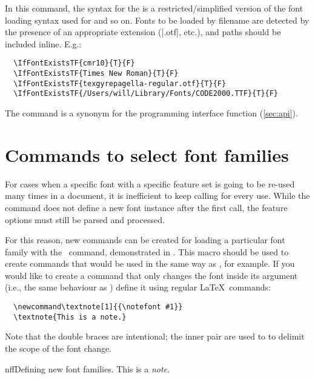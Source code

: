 \documentclass[a4paper]{l3doc}
\begin{document}
In this command, the syntax for the  is a restricted/simplified version of the font loading syntax used for  and so on.
Fonts to be loaded by filename are detected by the presence of an appropriate extension (|.otf|, etc.), and paths should be included inline.
E.g.:
\begin{Verbatim}
  \IfFontExistsTF{cmr10}{T}{F}
  \IfFontExistsTF{Times New Roman}{T}{F}
  \IfFontExistsTF{texgyrepagella-regular.otf}{T}{F}
  \IfFontExistsTF{/Users/will/Library/Fonts/CODE2000.TTF}{T}{F}
\end{Verbatim}

The  command is a synonym for the programming interface function  (\vref*{sec:api}).



\section{Commands to select font families}


\noindent For cases when a specific font with a specific
feature set is going to be re-used many times in a document, it is inefficient
to keep calling  for every use. While the  command does not define
a new font instance after the first call, the feature options must still be
parsed and processed.

\DescribeMacro{\newfontfamily}
For this reason, new commands can be created for loading a particular font
family with the \cmd\newfontfamily\ command, demonstrated in .
This macro should be used to create commands that would be used in
the same way as \cmd\rmfamily, for example.
If you would like to create a command that only changes the font
inside its argument (i.e., the same behaviour as ) define it using regular \LaTeX\
commands:
\begin{Verbatim}
  \newcommand\textnote[1]{{\notefont #1}}
  \textnote{This is a note.}
\end{Verbatim}
Note that the double braces are intentional; the inner pair are used to
to delimit the scope of the font change.

\begin{Lexample}{nff}{Defining new font families.}
  \newfontfamily{}
  \notefont This is a \emph{note}.
\end{Lexample}
\end{document}
